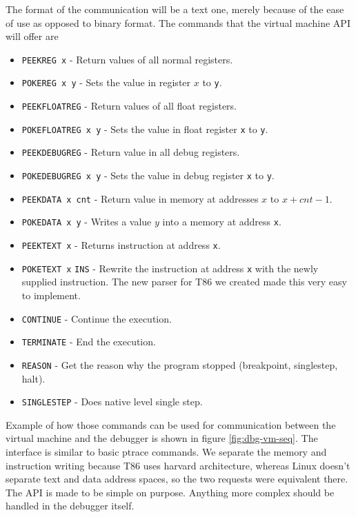 The format of the communication will be a text one, merely because of the ease
of use as opposed to binary format. The commands that the virtual machine API
will offer are
\begin{itemize}
    \item \texttt{PEEKREG x} - Return values of all normal registers.
    \item \texttt{POKEREG x y} - Sets the value in register $x$ to
        \texttt{y}.
    \item \texttt{PEEKFLOATREG} - Return values of all float registers.
    \item \texttt{POKEFLOATREG x y} - Sets the value in float register
        \texttt{x} to \texttt{y}.
    \item \texttt{PEEKDEBUGREG} - Return value in all debug registers.
    \item \texttt{POKEDEBUGREG x y} - Sets the value in debug register
        \texttt{x} to \texttt{y}.
    \item \texttt{PEEKDATA x cnt} - Return value in memory at addresses $x$ to $x + cnt - 1$.
    \item \texttt{POKEDATA x y} - Writes a value $y$ into a memory at
        address \texttt{x}.
    \item \texttt{PEEKTEXT x} - Returns instruction at address \texttt{x}.
    \item \texttt{POKETEXT x} \texttt{INS} - Rewrite the instruction at address
        \texttt{x} with the newly supplied instruction. The new parser for T86
        we created made this very easy to implement.
    \item \texttt{CONTINUE} - Continue the execution.
    \item \texttt{TERMINATE} - End the execution.
    \item \texttt{REASON} - Get the reason why the program stopped (breakpoint,
        singlestep, halt).
    \item \texttt{SINGLESTEP} - Does native level single step.
\end{itemize}
Example of how those commands can be used for communication between the virtual
machine and the debugger is shown in figure \ref{fig:dbg-vm-seq}. The interface
is similar to basic ptrace commands. We separate the memory and instruction
writing because T86 uses harvard architecture, whereas Linux doesn't separate
text and data address spaces\cite{ptrace}, so the two requests were equivalent
there. The API is made to be simple on purpose. Anything more complex should
be handled in the debugger itself.

